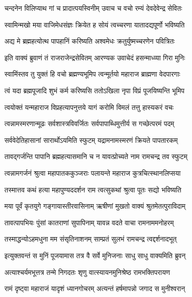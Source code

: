 \twolineshloka
{चन्दनेन विलिप्याथ गां च प्रादात्पयस्विनीम्}
{उवाच च वचो रम्यं देवदेवेन्द्र सेवितः}%

\twolineshloka
{स्वामिन्मखो मया वाजिमेधसंज्ञः क्रियेत ह}
{सोयं त्वच्चरणा यातादद्यपूर्णो भविष्यति}%

\twolineshloka
{अद्य मे ब्रह्महत्योत्थ पापहानिं करिष्यति}
{अश्वमेधः क्रतुर्युष्मच्चरणेन पवित्रितः}%

\twolineshloka
{इति वाक्यं ब्रुवाणं तं राजराजेन्द्रसेवितम्}
{आरण्यक उवाचेदं हसन्माध्व्या गिरा मुनिः}%

\twolineshloka
{स्वामिंस्तव तु युक्तं हि वचो ब्रह्मण्यभूमिप}
{त्वन्मूर्तयो महाराज ब्राह्मणा वेदपारगाः}%

\twolineshloka
{त्वं यदा ब्रह्मपूजादि शुभं कर्म करिष्यसि}
{ततोऽखिला नृपा विप्रं पूजयिष्यन्ति भूमिप}%

\twolineshloka
{त्वयोक्तं यन्महाराज विप्रहत्यापनुत्तये}
{यागं करोमि विमलं तत्तु हास्यकरं वचः}%

\twolineshloka
{त्वन्नामस्मरणान्मूढः सर्वशास्त्रविवर्जितः}
{सर्वपापाब्धिमुत्तीर्य स गच्छेत्परमं पदम्}%

\twolineshloka
{सर्ववेदेतिहासानां सारार्थोऽयमिति स्फुटम्}
{यद्रामनामस्मरणं क्रियते पापतारकम्}%

\twolineshloka
{तावद्गर्जन्ति पापानि ब्रह्महत्यासमानि च}
{न यावत्प्रोच्यते नाम रामचन्द्र तव स्फुटम्}%

\twolineshloka
{त्वन्नामगर्जनं श्रुत्वा महापातककुञ्जराः}
{पलायन्ते महाराज कुत्रचित्स्थानलिप्सया}%

\twolineshloka
{तस्मात्तव कथं हत्या महापुण्यददर्शन}
{राम त्वत्सुकथां श्रुत्वा पूतः सद्यो भविष्यति}%

\twolineshloka
{मया पूर्वं कृतयुगे गङ्गायास्तीरवासिनाम्}
{ऋषीणां मुखतो वाक्यं श्रुतमेतत्पुराविदाम्}%

\twolineshloka
{तावत्पापभियः पुंसां कातराणां सुपापिनाम्}
{यावन्न वदते वाचा रामनाममनोहरम्}%

\twolineshloka
{तस्माद्धन्योऽहमधुना मम संसृतिनाशनम्}
{साम्प्रतं सुलभं रामचन्द्र त्वद्दर्शनादभूत्}%

\twolineshloka
{इत्युक्तवन्तं स मुनिं पूजयामास तत्र वै}
{सर्वे मुनिजनाः साधु साधु वाक्यमिति ब्रुवन्}%


\twolineshloka
{अत्याश्चर्यमभूत्तत्र तन्मे निगदतः शृणु}
{वात्स्यायनमुनिश्रेष्ठ रामभक्तिपरायण}%

\twolineshloka
{रामं दृष्ट्वा महाराजं यादृशं ध्यानगोचरम्}
{अत्यन्तं हर्षमापन्नो जगाद स मुनीश्वरान्}%

